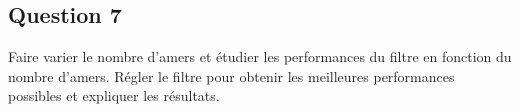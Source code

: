 \documentclass[../CSC_5RO12_TA_TP2.tex]{subfiles}
\begin{document}
\subsection{Question 7}

Faire varier le nombre d'amers et étudier les performances du filtre en fonction du nombre d'amers. Régler le filtre pour obtenir les meilleures performances possibles et expliquer les résultats.
\end{document}
